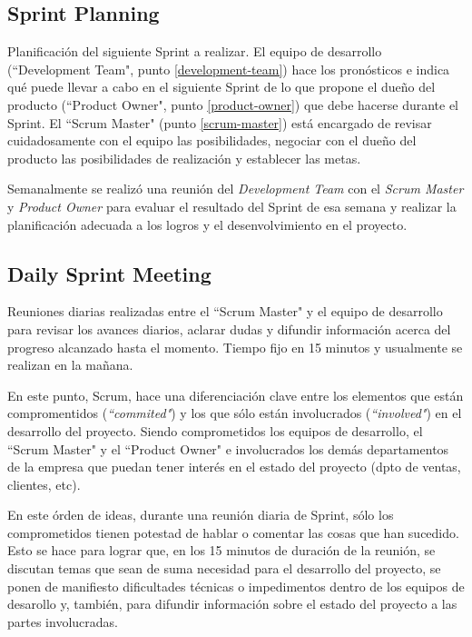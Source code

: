         \subsection{Sprint Planning}
        
        Planificación del siguiente Sprint a realizar. El equipo de desarrollo (``Development Team", punto \ref{development-team}) hace los pronósticos e indica qué puede llevar a cabo en el siguiente Sprint de lo que propone el dueño del producto (``Product Owner", punto \ref{product-owner}) que debe hacerse durante el Sprint. El ``Scrum Master" (punto \ref{scrum-master}) está encargado de revisar cuidadosamente con el equipo las posibilidades, negociar con el dueño del producto las posibilidades de realización y establecer las metas.
        
        Semanalmente se realizó una reunión del \textit{Development Team} con el \textit{Scrum Master} y \textit{Product Owner} para evaluar el resultado del Sprint de esa semana y realizar la planificación adecuada a los logros y el desenvolvimiento en el proyecto.
        
        \subsection{Daily Sprint Meeting}
        
        Reuniones diarias realizadas entre el ``Scrum Master" y el equipo de desarrollo para revisar los avances diarios, aclarar dudas y difundir información acerca del progreso alcanzado hasta el momento. Tiempo fijo en 15 minutos y usualmente se realizan en la mañana.
        
        En este punto, Scrum, hace una diferenciación clave entre los elementos que están compromentidos (\textit{``commited"}) y los que sólo están involucrados (\textit{``involved"}) en el desarrollo del proyecto. Siendo comprometidos los equipos de desarrollo, el ``Scrum Master" y el ``Product Owner" e involucrados los demás departamentos de la empresa que puedan tener interés en el estado del proyecto (dpto de ventas, clientes, etc). 
        
        En este órden de ideas, durante una reunión diaria de Sprint, sólo los comprometidos tienen potestad de hablar o comentar las cosas que han sucedido. Esto se hace para lograr que, en los 15 minutos de duración de la reunión, se discutan temas que sean de suma necesidad para el desarrollo del proyecto, se ponen de manifiesto dificultades técnicas o impedimentos dentro de los equipos de desarollo y, también, para difundir información sobre el estado del proyecto a las partes involucradas.
        
